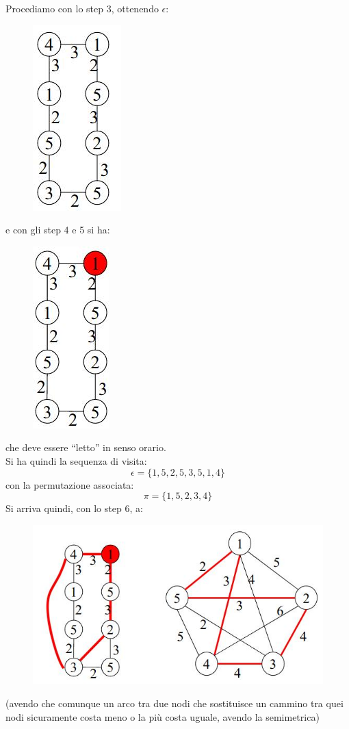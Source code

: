 \begin{esempio}
\begin{figure}[H]
  \end{figure}
  Procediamo con lo step 3, ottenendo $\epsilon$:
  \begin{figure}[H]
    \centering
    \includegraphics[scale = 0.4]{img/ch4.jpg}
  \end{figure}
  e con gli step 4 e 5 si ha:
  \begin{figure}[H]
    \centering
    \includegraphics[scale = 0.4]{img/ch5.jpg}
  \end{figure}
  che deve essere ``letto'' in senso orario.\\
  Si ha quindi la sequenza di visita:
  \[\epsilon=\{1,5,2,5,3,5,1,4\}\]
  con la permutazione associata:
  \[\pi=\{1,5,2,3,4\}\]
  Si arriva quindi, con lo step 6, a:
  \begin{figure}[H]
    \centering
    \includegraphics[scale = 0.4]{img/ch6.jpg}
  \end{figure}
  (avendo che comunque un arco tra due nodi che sostituisce un cammino tra quei
  nodi sicuramente costa meno o la più costa uguale, avendo la semimetrica)
\end{esempio}
